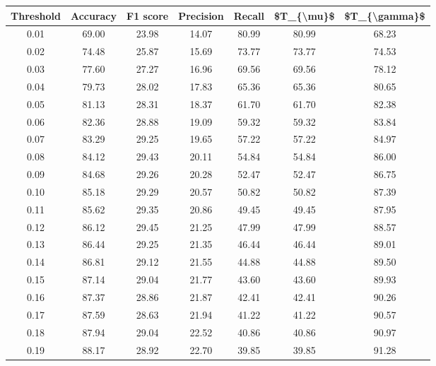 \begin{tabular}{|c|c|c|c|c|c|c|}
\hline
 Threshold &  Accuracy &  F1 score &  Precision &  Recall &  \$T\_\{\textbackslash mu\}\$ &  \$T\_\{\textbackslash gamma\}\$ \\
\hline
      0.01 &     69.00 &     23.98 &      14.07 &   80.99 &      80.99 &         68.23 \\
      0.02 &     74.48 &     25.87 &      15.69 &   73.77 &      73.77 &         74.53 \\
      0.03 &     77.60 &     27.27 &      16.96 &   69.56 &      69.56 &         78.12 \\
      0.04 &     79.73 &     28.02 &      17.83 &   65.36 &      65.36 &         80.65 \\
      0.05 &     81.13 &     28.31 &      18.37 &   61.70 &      61.70 &         82.38 \\
      0.06 &     82.36 &     28.88 &      19.09 &   59.32 &      59.32 &         83.84 \\
      0.07 &     83.29 &     29.25 &      19.65 &   57.22 &      57.22 &         84.97 \\
      0.08 &     84.12 &     29.43 &      20.11 &   54.84 &      54.84 &         86.00 \\
      0.09 &     84.68 &     29.26 &      20.28 &   52.47 &      52.47 &         86.75 \\
      0.10 &     85.18 &     29.29 &      20.57 &   50.82 &      50.82 &         87.39 \\
      0.11 &     85.62 &     29.35 &      20.86 &   49.45 &      49.45 &         87.95 \\
      0.12 &     86.12 &     29.45 &      21.25 &   47.99 &      47.99 &         88.57 \\
      0.13 &     86.44 &     29.25 &      21.35 &   46.44 &      46.44 &         89.01 \\
      0.14 &     86.81 &     29.12 &      21.55 &   44.88 &      44.88 &         89.50 \\
      0.15 &     87.14 &     29.04 &      21.77 &   43.60 &      43.60 &         89.93 \\
      0.16 &     87.37 &     28.86 &      21.87 &   42.41 &      42.41 &         90.26 \\
      0.17 &     87.59 &     28.63 &      21.94 &   41.22 &      41.22 &         90.57 \\
      0.18 &     87.94 &     29.04 &      22.52 &   40.86 &      40.86 &         90.97 \\
      0.19 &     88.17 &     28.92 &      22.70 &   39.85 &      39.85 &         91.28 \\

\end{tabular}
